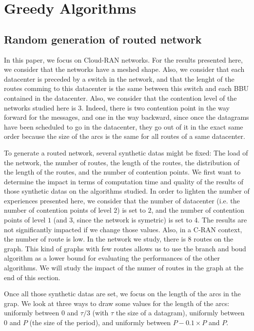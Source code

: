 \documentclass[english]{article}
\begin{document}
\section{Greedy Algorithms}


\subsection{Random generation of routed network}
In this paper, we focus on Cloud-RAN networks. For the results presented here, we consider that the networks have a meshed shape. Also, we consider that each datacenter is preceded by a switch in the network, and that the lenght of the routes comming to this datacenter is the same between this switch and each BBU contained in the datacenter.
Also, we consider that the contention level of the networks studied here is $3$. Indeed, there is two contention point in the way forward for the messages, and one in the way backward, since once the datagrams have been scheduled to go in the datacenter, they go out of it in the exact same order because the size of the arcs is the same for all routes of a same datacenter.

To generate a routed network, several synthetic datas might be fixed: The load of the network, the number of routes, the length of the routes, the distribution of the length of the routes, and the number of contention points.  We first want to determine the impact in terms of computation time and quality of the results of those synthetic datas on the algorithms studied.
In order to lighten the number of experiences presented here, we consider that the number of datacenter (i.e. the number of contention points of level $2$) is set to $2$, and the number of contention points of level $1$ (and $3$, since the network is symetric) is set to $4$. The results are not significantly impacted if we change those values. 
Also, in a C-RAN context, the number of route is low. In the network we study, there is $8$ routes on the graph. This kind of graphs with few routes allows us to use the branch and boud algorithm as a lower bound for evaluating the performances of the other algorithms. We will study the impact of the numer of routes in the graph at the end of this section.

Once all those synthetic datas are set, we focus on the length of the arcs in the grap. We look at three ways to draw some values for the length of the arcs: uniformly between $0$ and $\tau/3$ (with $\tau$ the size of a datagram), uniformly between $0$ and $P$ (the size of the period), and uniformly between $P-0.1\times P$ and $P$.
\end{document}
